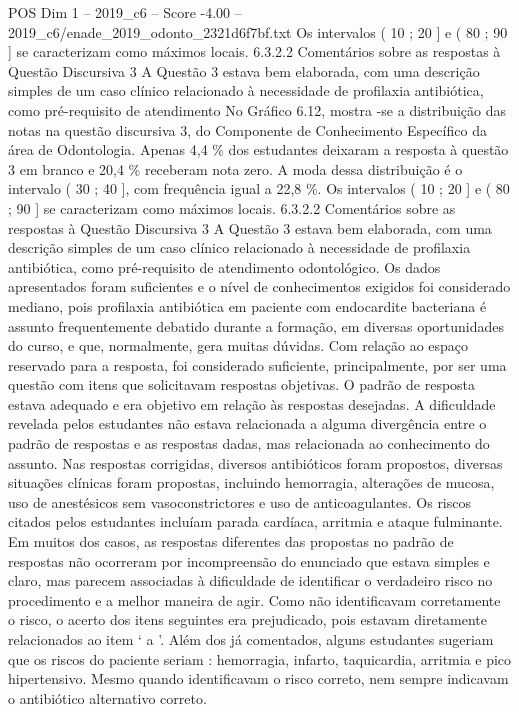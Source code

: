 \begin{textsample}{POS Dim 1 – 2019\_c6 – Score -4.00 – 2019\_c6/enade\_2019\_odonto\_2321d6f7bf.txt}
Os intervalos ( 10 ; 20 ] e ( 80 ; 90 ] se caracterizam como máximos locais. 6.3.2.2 Comentários sobre as respostas à Questão Discursiva 3 A Questão 3 estava bem elaborada, com uma descrição simples de um caso clínico relacionado à necessidade de profilaxia antibiótica, como pré-requisito de atendimento No Gráfico 6.12, mostra -se a distribuição das notas na questão discursiva 3, do Componente de Conhecimento Específico da área de Odontologia.
Apenas 4,4 \% dos estudantes deixaram a resposta à questão 3 em branco e 20,4 \% receberam nota zero.
A moda dessa distribuição é o intervalo ( 30 ; 40 ], com frequência igual a 22,8 \%.
Os intervalos ( 10 ; 20 ] e ( 80 ; 90 ] se caracterizam como máximos locais. 6.3.2.2 Comentários sobre as respostas à Questão Discursiva 3 A Questão 3 estava bem elaborada, com uma descrição simples de um caso clínico relacionado à necessidade de profilaxia antibiótica, como pré-requisito de atendimento odontológico.
Os dados apresentados foram suficientes e o nível de conhecimentos exigidos foi considerado mediano, pois profilaxia antibiótica em paciente com endocardite bacteriana é assunto frequentemente debatido durante a formação, em diversas oportunidades do curso, e que, normalmente, gera muitas dúvidas.
Com relação ao espaço reservado para a resposta, foi considerado suficiente, principalmente, por ser uma questão com itens que solicitavam respostas objetivas.
O padrão de resposta estava adequado e era objetivo em relação às respostas desejadas.
A dificuldade revelada pelos estudantes não estava relacionada a alguma divergência entre o padrão de respostas e as respostas dadas, mas relacionada ao conhecimento do assunto.
Nas respostas corrigidas, diversos antibióticos foram propostos, diversas situações clínicas foram propostas, incluindo hemorragia, alterações de mucosa, uso de anestésicos sem vasoconstrictores e uso de anticoagulantes.
Os riscos citados pelos estudantes incluíam parada cardíaca, arritmia e ataque fulminante.
Em muitos dos casos, as respostas diferentes das propostas no padrão de respostas não ocorreram por incompreensão do enunciado que estava simples e claro, mas parecem associadas à dificuldade de identificar o verdadeiro risco no procedimento e a melhor maneira de agir.
Como não identificavam corretamente o risco, o acerto dos itens seguintes era prejudicado, pois estavam diretamente relacionados ao item ‘ a ’.
Além dos já comentados, alguns estudantes sugeriam que os riscos do paciente seriam : hemorragia, infarto, taquicardia, arritmia e pico hipertensivo.
Mesmo quando identificavam o risco correto, nem sempre indicavam o antibiótico alternativo correto.

\end{textsample}
